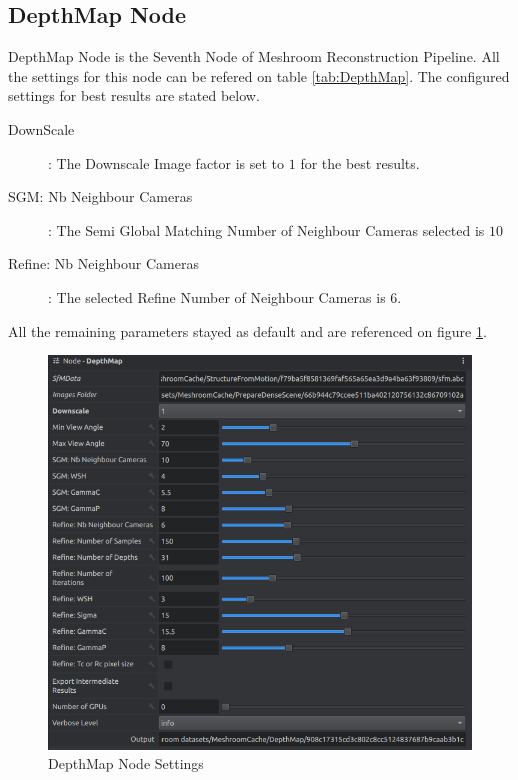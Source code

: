 \documentclass[12pt]{report}
\begin{document}
\subsection*{DepthMap Node}
DepthMap Node is the Seventh Node of Meshroom Reconstruction Pipeline.  All the settings for this node can be refered on table \ref{tab:DepthMap}.
The configured settings for best results are stated below. 

\begin{description}
  \item[DownScale]: The Downscale Image factor is set to $1$ for the best results.
  \item[SGM: Nb Neighbour Cameras] : The  Semi Global Matching Number of Neighbour Cameras selected is $10$
  \item[Refine: Nb Neighbour Cameras]: The selected Refine Number of Neighbour Cameras is $6$.    
\end{description}

All the remaining parameters stayed as default and are referenced on figure \ref{fig:DepthMapSetting}.

\begin{figure}[H]%
  \centering
 \includegraphics[width=1\textwidth]{DepthMapSetting.png}
\caption{DepthMap Node Settings}
\label{fig:DepthMapSetting} 
\end{figure}
\end{document}
